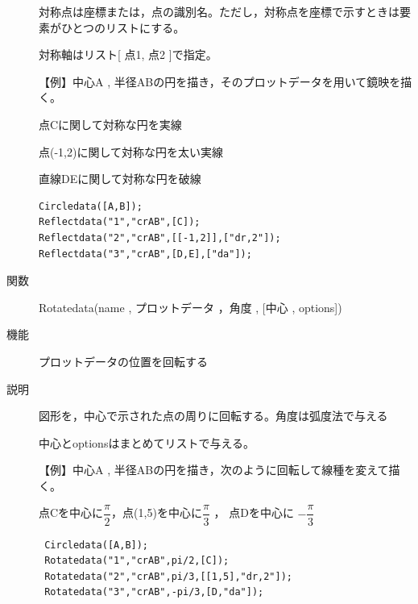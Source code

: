\documentclass[papersize,a4paper,10pt,uplatex]{jsarticle}
\begin{document}
\begin{description}
対称点は座標または，点の識別名。ただし，対称点を座標で示すときは要素がひとつのリストにする。

対称軸はリスト[ 点1, 点2 ]で指定。

\vspace{\baselineskip}
【例】中心A , 半径ABの円を描き，そのプロットデータを用いて鏡映を描く。

点Cに関して対称な円を実線

点(-1,2)に関して対称な円を太い実線

直線DEに関して対称な円を破線

\begin{verbatim}
Circledata([A,B]);
Reflectdata("1","crAB",[C]);
Reflectdata("2","crAB",[[-1,2]],["dr,2"]);
Reflectdata("3","crAB",[D,E],["da"]);
\end{verbatim}

\vspace{\baselineskip}
 \begin{center}  \end{center}


\vspace{\baselineskip}
\hypertarget{rotatedata}{}
\item[関数]Rotatedata(name , プロットデータ ，角度 , [中心 , options])
\item[機能]プロットデータの位置を回転する
\item[説明]図形を，中心で示された点の周りに回転する。角度は弧度法で与える

中心とoptionsはまとめてリストで与える。

\begin{spacing}{1.5}
【例】中心A , 半径ABの円を描き，次のように回転して線種を変えて描く。

 点Cを中心に$\dfrac{\pi}{2} $，点(1,5)を中心に$\dfrac{\pi}{3}$ ， 点Dを中心に $-\dfrac{\pi}{3} $
\end{spacing}
\begin{verbatim}
 Circledata([A,B]);
 Rotatedata("1","crAB",pi/2,[C]);
 Rotatedata("2","crAB",pi/3,[[1,5],"dr,2"]);
 Rotatedata("3","crAB",-pi/3,[D,"da"]);
\end{verbatim}
\vspace{\baselineskip}
\begin{center}\scalebox{0.9}{  }\end{center}
 

\end{description}
\end{document}

